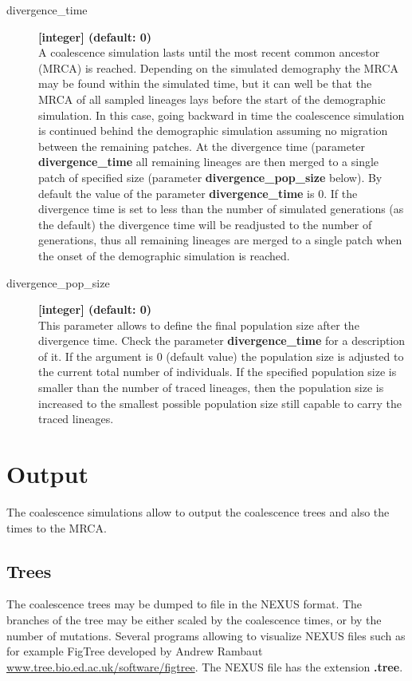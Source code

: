 \documentclass[letterpaper,12pt,oneside]{book}
\begin{document}
\begin{description}
\item[divergence\_time] \textbf{[integer] (default: 0)}\\ 
A coalescence simulation lasts until the most recent common ancestor (MRCA) is reached. Depending on the simulated demography the MRCA may be found within the simulated time, but it can well be that the MRCA of all sampled lineages lays before the start of the demographic simulation. In this case, going backward in time the coalescence simulation is continued behind the demographic simulation assuming no migration between the remaining patches. At the divergence time (parameter \textbf{divergence\_time} all remaining lineages are then merged to a single patch of specified size (parameter \textbf{divergence\_pop\_size} below). By default the value of the parameter \textbf{divergence\_time} is 0. If the divergence time is set to less than the number of simulated generations (as the default) the divergence time will be readjusted to the number of generations, thus all remaining lineages are merged to a single patch when the onset of the demographic simulation is reached. 

\item[divergence\_pop\_size] \textbf{[integer] (default: 0)}\\ 
This parameter allows to define the final population size after the divergence time. Check the parameter \textbf{divergence\_time} for a description of it. If the argument is 0 (default value) the population size is adjusted to the current total number of individuals. If the specified population size is smaller than the number of traced lineages, then the population size is increased to the smallest possible population size still capable to carry the traced lineages. 
\end{description} 
 

\section{Output}
The coalescence simulations allow to output the coalescence trees and also the times to the MRCA.

\subsection{Trees}\label{coalTrees}
The coalescence trees may be dumped to file in the NEXUS format. The branches of the tree may be either scaled by the coalescence times, or by the number of mutations. Several programs allowing to visualize NEXUS files such as for example FigTree developed by Andrew Rambaut \url{www.tree.bio.ed.ac.uk/software/figtree}. The NEXUS file has the extension \textbf{.tree}.
\end{document}
